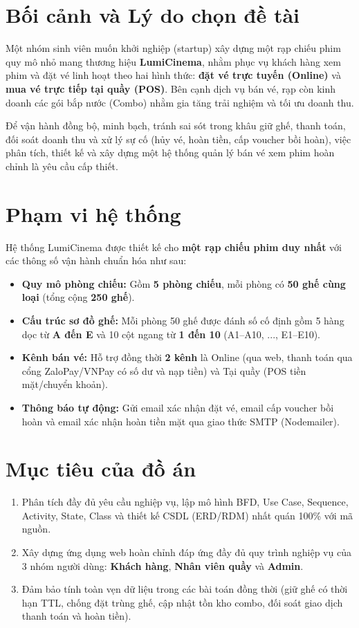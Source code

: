 \section{Bối cảnh và Lý do chọn đề tài}
Một nhóm sinh viên muốn khởi nghiệp (startup) xây dựng một rạp chiếu phim quy mô nhỏ mang thương hiệu \textbf{LumiCinema}, nhằm phục vụ khách hàng xem phim và đặt vé linh hoạt theo hai hình thức: \textbf{đặt vé trực tuyến (Online)} và \textbf{mua vé trực tiếp tại quầy (POS)}. Bên cạnh dịch vụ bán vé, rạp còn kinh doanh các gói bắp nước (Combo) nhằm gia tăng trải nghiệm và tối ưu doanh thu.

Để vận hành đồng bộ, minh bạch, tránh sai sót trong khâu giữ ghế, thanh toán, đối soát doanh thu và xử lý sự cố (hủy vé, hoàn tiền, cấp voucher bồi hoàn), việc phân tích, thiết kế và xây dựng một hệ thống quản lý bán vé xem phim hoàn chỉnh là yêu cầu cấp thiết.

\section{Phạm vi hệ thống}
Hệ thống LumiCinema được thiết kế cho \textbf{một rạp chiếu phim duy nhất} với các thông số vận hành chuẩn hóa như sau:
\begin{itemize}[leftmargin=1.2cm]
  \item \textbf{Quy mô phòng chiếu:} Gồm \textbf{5 phòng chiếu}, mỗi phòng có \textbf{50 ghế cùng loại} (tổng cộng \textbf{250 ghế}).
  \item \textbf{Cấu trúc sơ đồ ghế:} Mỗi phòng 50 ghế được đánh số cố định gồm 5 hàng dọc từ \textbf{A đến E} và 10 cột ngang từ \textbf{1 đến 10} (A1--A10, ..., E1--E10).
  \item \textbf{Kênh bán vé:} Hỗ trợ đồng thời \textbf{2 kênh} là Online (qua web, thanh toán qua cổng ZaloPay/VNPay có số dư và nạp tiền) và Tại quầy (POS tiền mặt/chuyển khoản).
  \item \textbf{Thông báo tự động:} Gửi email xác nhận đặt vé, email cấp voucher bồi hoàn và email xác nhận hoàn tiền mặt qua giao thức SMTP (Nodemailer).
\end{itemize}

\section{Mục tiêu của đồ án}
\begin{enumerate}[leftmargin=1.2cm]
  \item Phân tích đầy đủ yêu cầu nghiệp vụ, lập mô hình BFD, Use Case, Sequence, Activity, State, Class và thiết kế CSDL (ERD/RDM) nhất quán 100\% với mã nguồn.
  \item Xây dựng ứng dụng web hoàn chỉnh đáp ứng đầy đủ quy trình nghiệp vụ của 3 nhóm người dùng: \textbf{Khách hàng}, \textbf{Nhân viên quầy} và \textbf{Admin}.
  \item Đảm bảo tính toàn vẹn dữ liệu trong các bài toán đồng thời (giữ ghế có thời hạn TTL, chống đặt trùng ghế, cập nhật tồn kho combo, đối soát giao dịch thanh toán và hoàn tiền).
\end{enumerate}

